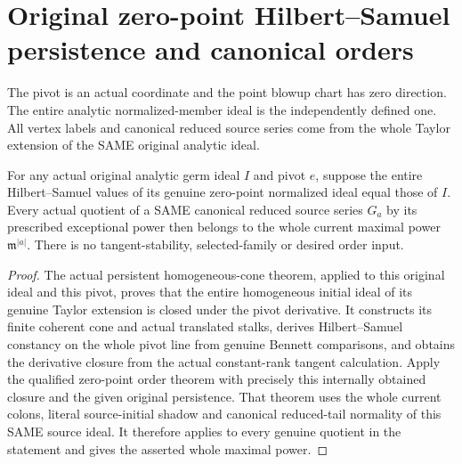 \section{Original zero-point Hilbert--Samuel persistence and canonical orders}

The pivot is an actual coordinate and the point blowup chart has zero
direction. The entire analytic normalized-member ideal is the independently
defined one. All vertex labels and canonical reduced source series come
from the whole Taylor extension of the SAME original analytic ideal.

\begin{theorem}
\label{hir:actual-original-zero-point-persistent-hs-all-canonical-orders}
\leanok
For any actual original analytic germ ideal $I$ and pivot $e$, suppose
the entire Hilbert--Samuel values of its genuine zero-point normalized
ideal equal those of $I$. Every actual quotient of a SAME canonical
reduced source series $G_a$ by its prescribed exceptional power then
belongs to the whole current maximal power $\mathfrak m^{|a|}$.
There is no tangent-stability, selected-family or desired order input.
\end{theorem}
\begin{proof}
The actual persistent homogeneous-cone theorem, applied to this original
ideal and this pivot, proves that the entire homogeneous initial ideal
of its genuine Taylor extension is closed under the pivot derivative.
It constructs its finite coherent cone and actual translated stalks,
derives Hilbert--Samuel constancy on the whole pivot line from genuine
Bennett comparisons, and obtains the derivative closure from the actual
constant-rank tangent calculation. Apply the qualified zero-point
order theorem with precisely this internally obtained closure and the
given original persistence. That theorem uses the whole current colons,
literal source-initial shadow and canonical reduced-tail normality of
this SAME source ideal. It therefore applies to every genuine quotient
in the statement and gives the asserted whole maximal power.
\end{proof}

